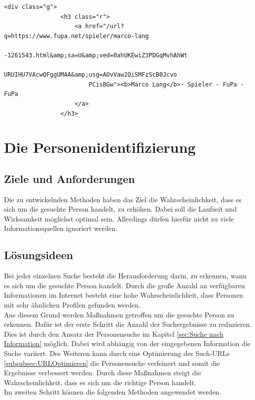 			\begin{lstlisting}[caption=Ausschnitt des Quelltextes von einem einem Google-Suchergebnis \cite{suchergebnisseMarco},label={lst:GoogleSeitenquelltext}]
			<div class="g">
				<h3 class="r">
					<a href="/url?q=https://www.fupa.net/spieler/marco-lang
						-1261543.html&amp;sa=U&amp;ved=0ahUKEwiZ3PDGqMvhAhWt
						URUIHU7VAcwQFggUMAA&amp;usg=AOvVaw2QiSMFzScB0Jcvo
						PCisBGw"><b>Marco Lang</b>- Spieler - FuPa - FuPa
					</a>
				</h3>	
			\end{lstlisting} 
			
\section{Die Personenidentifizierung}
	\subsection{Ziele und Anforderungen}
	Die zu entwickelnden Methoden haben das Ziel die Wahrscheinlichkeit, dass es sich um die gesuchte Person handelt, zu erhöhen. Dabei soll die Laufzeit und Wirksamkeit möglichst optimal sein. Allerdings dürfen hierfür nicht zu viele Informationsquellen ignoriert werden.
	
	\subsection{Lösungsideen}
	\label{sec:WannhandeltessichumdiegesuchtePerson}
	Bei jeder einzelnen Suche besteht die Herausforderung darin, zu erkennen, wann es sich um die gesuchte Person handelt. Durch die große Anzahl an verfügbaren Informationen im Internet besteht eine hohe Wahrscheinlichkeit, dass Personen mit sehr ähnlichen Profilen gefunden werden.\\
	Aus diesem Grund werden Maßnahmen getroffen um die gesuchte Person zu erkennen. Dafür ist der erste Schritt die Anzahl der Suchergebnisse zu reduzieren. Dies ist durch den Ansatz der Personensuche im Kapitel \ref{sec:Suche nach Information} möglich. Dabei wird abhängig von der eingegebenen Information die Suche variiert. Des Weiteren kann durch eine Optimierung des Such-URLs \ref{subsubsec:URLOptimieren} die Personensuche verfeinert und somit die Ergebnisse verbessert werden. Durch diese Maßnahmen steigt die Wahrscheinlichkeit, dass es sich um die richtige Person handelt.\\
	Im zweiten Schritt können die folgenden Methoden angewendet werden.

